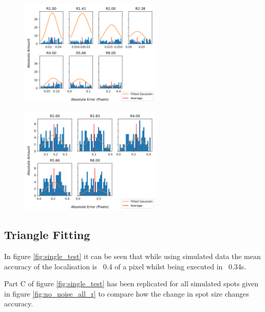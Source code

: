 \documentclass[aps,pra,a4paper,nofootinbib,onecolumn,tightenlines,longbibliography,12pt,amsfonts,amssymb,amsmath,floatfix]{revtex4-2} %
\begin{document}
  \begin{figure}[H]
    \begin{center}
      \includegraphics[width=0.6\textwidth]{project_pics/distro_centriod_11.png}
    \end{center}
    \caption{}
    \label{fig:box_11}
  \end{figure}
  
  \begin{figure}[H]
    \begin{center}
      \includegraphics[width=0.6\textwidth]{project_pics/noise_cen_scatter_11.png}
    \end{center}
    \caption{}
    \label{fig:box_11_noise}
  \end{figure}
  
  

  \subsection{Triangle Fitting} %
  \label{sub:Triangle Fitting}

  In figure \ref{fig:single_test} it can be seen that while using simulated data the mean accuracy of the 
  localisation is ~0.4 of a pixel whilst being executed in ~0.34s.

  Part C of figure \ref{fig:single_test} has been replicated for all simulated spots given in figure \ref{fig:no_noise_all_r}
  to compare how the change in spot size changes accuracy.
\end{document}
